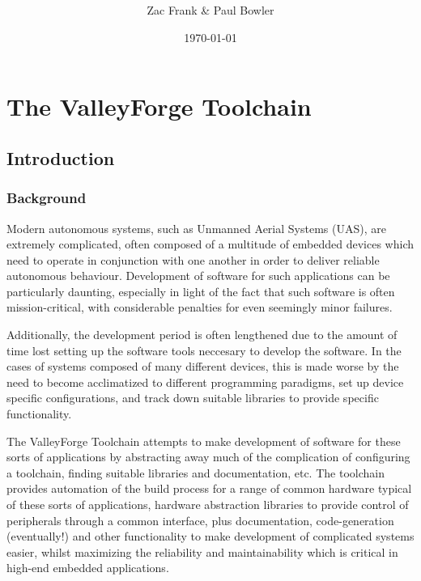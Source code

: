 \documentclass[a4paper, oneside, 11pt, titlepage, onecolumn, openright]{report}
\title{\projecttitle \\ \documenttitle}
\author{Zac Frank \& Paul Bowler}
\date{\today}
\begin{document}
	\maketitle
	
	\clearpage
	\tableofcontents



	\clearpage

	\part{The ValleyForge Toolchain}
		\label{part:toolchain}

		\chapter{Introduction}
			\label{c:Introduction}
			
			\section{Background}
				\label{s:Introduction:Background}
				
				Modern autonomous systems, such as Unmanned Aerial Systems (UAS), are extremely complicated, often composed of a multitude of embedded devices which need to operate in conjunction with one another in order to deliver reliable autonomous behaviour.  Development of software for such applications can be particularly daunting, especially in light of the fact that such software is often mission-critical, with considerable penalties for even seemingly minor failures.
				
				Additionally, the development period is often lengthened due to the amount of time lost setting up the software tools neccesary to develop the software.  In the cases of systems composed of many different devices, this is made worse by the need to become acclimatized to different programming paradigms, set up device specific configurations, and track down suitable libraries to provide specific functionality.
				
				The ValleyForge Toolchain attempts to make development of software for these sorts of applications by abstracting away much of the complication of configuring a toolchain, finding suitable libraries and documentation, etc.  The toolchain provides automation of the build process for a range of common hardware typical of these sorts of applications, hardware abstraction libraries to provide control of peripherals through a common interface, plus documentation, code-generation (eventually!) and other functionality to make development of complicated systems easier, whilst maximizing the reliability and maintainability which is critical in high-end embedded applications.
			
\end{document}
